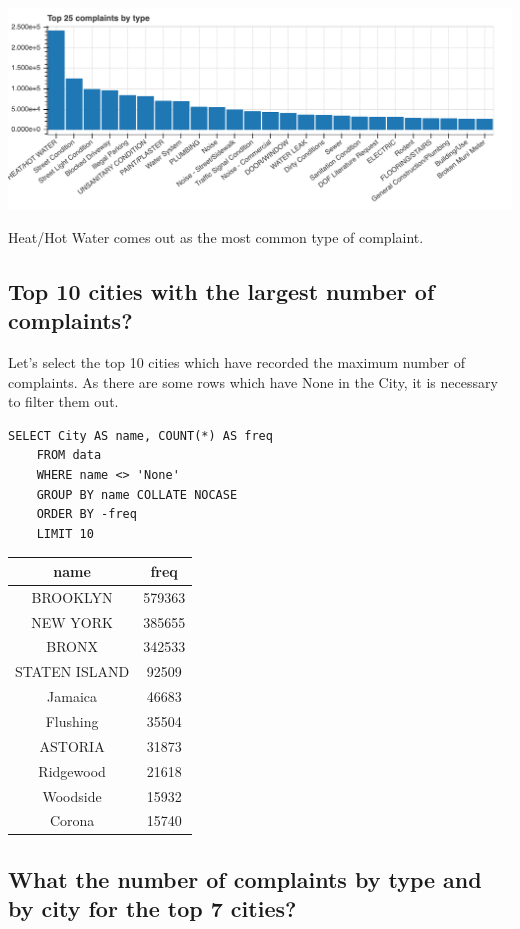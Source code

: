 \documentclass[12pt,a4paper]{article}
\begin{document}
\includegraphics[scale=0.3]{top25complaints}

Heat/Hot Water comes out as the most common type of complaint.

\subsection{Top 10 cities with the largest number of complaints?}
Let's select the top 10 cities which have recorded the maximum number of complaints. As there are some rows which have None in the City, it is necessary to filter them out.
\begin{verbatim}
SELECT City AS name, COUNT(*) AS freq
    FROM data
    WHERE name <> 'None'
    GROUP BY name COLLATE NOCASE
    ORDER BY -freq
    LIMIT 10
\end{verbatim}

\begin{center}
 \begin{tabular}{||c c||}
 \hline
 name & freq \\ [0.5ex]
 \hline\hline
BROOKLYN    & 579363 \\
NEW YORK    & 385655 \\
BRONX   & 342533 \\
STATEN ISLAND   & 92509 \\
Jamaica & 46683 \\
Flushing    & 35504 \\
ASTORIA & 31873 \\
Ridgewood   & 21618 \\
Woodside    & 15932 \\
Corona  & 15740 \\ [1ex]
 \hline
\end{tabular}
\end{center}

\subsection{What the number of complaints by type and by city for the top 7 cities?}
\end{document}
